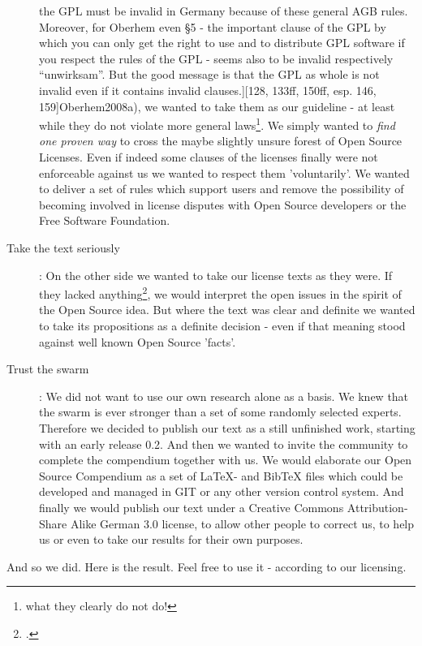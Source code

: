 \begin{description}
  the GPL must be invalid in Germany because of these general AGB rules.
  Moreover, for Oberhem even §5 - the important clause of the GPL by which you
  can only get the right to use and to distribute GPL software if you respect
  the rules of the GPL - seems also to be invalid respectively
  \enquote{unwirksam}. But the good message is that the GPL as whole is not
  invalid even if it contains invalid clauses.][128, 133ff, 150ff, esp. 146,
  159]{Oberhem2008a}), we wanted to take them as our guideline - at least while
  they do not violate more general laws\footnote{what they clearly do not do!}.
  We simply wanted to \emph{find one proven way} to cross the maybe slightly
  unsure forest of Open Source Licenses. Even if indeed some clauses of the
  licenses finally were not enforceable against us we wanted to respect them
  'voluntarily'. We wanted to deliver a set of rules which support users and
  remove the possibility of becoming involved in license disputes with Open
  Source developers or the Free Software Foundation.
  \item[Take the text seriously]: On the other side we wanted to take our
  license texts as they were. If they lacked anything\footcite[The systematical
  underdetermination of licenses is a problem being also known in the Open
  Source respectively Free Software movement. Following the biography of RMS his
  main judicial counselor Moglen has stated, that \enquote{there is uncertainty
  in every legal process (\ldots) } and that it seemed to be silly to try
  \enquote{(\ldots) to take out all the bugs (\ldots)}. Nevertheless - so
  Moglen resp. Williams - the goal of Richard Stallman was \enquote{the complete
  opposite}: He tried \enquote{(\ldots) to remove uncertainty which is
  inherently impossible}. But - and that's the nub of this analysis -
  Moglen had to follow Stallmann because of RMS character. And he had to
  summarize their work so, that \enquote{(\ldots) the resulting elegance (of the
  GPL; KR.), the resulting simplicity (of the GPL; KR.) in design almost
  achieves what it has to achieve}. Hence we are asked to take the license
  texts themselves seriously. cf.][177f]{Williams2002a}, we would interpret the
  open issues in the spirit of the Open Source idea. But where the text was
  clear and definite we wanted to take its propositions as a definite decision -
  even if that meaning stood against well known Open Source 'facts'.
  \item[Trust the swarm]: We did not want to use our own research alone as a
  basis. We knew that the swarm is ever stronger than a set of some randomly
  selected experts. Therefore we decided to publish our text as a still
  unfinished work, starting with an early release 0.2. And then we wanted
  to invite the community to complete the compendium together with us. We would elaborate our Open
  Source Compendium as a set of LaTeX- and BibTeX files which could be developed
  and managed in GIT or any other version control system. And finally we would
  publish our text under a Creative Commons Attribution-Share Alike German 3.0
  license, to allow other people to correct
  us, to help us or even to take our results for their own purposes.
\end{description}

And so we did. Here is the result. Feel free to use it - according to our
licensing.

%
